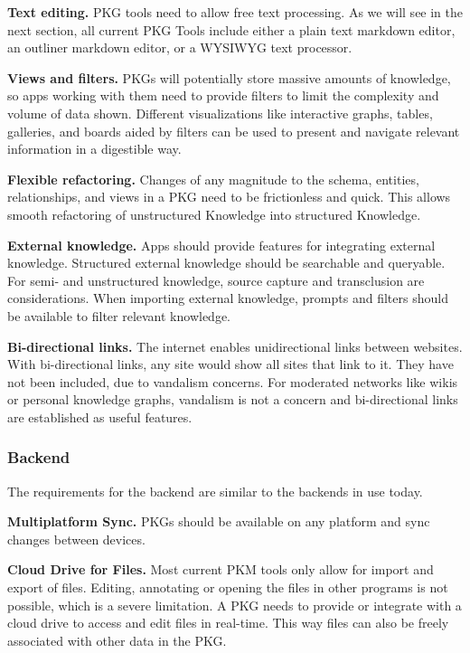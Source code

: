 \textbf{Text editing.} PKG tools need to allow free text processing. As we will see in the next section, all current PKG Tools include either a plain text markdown editor, an outliner markdown editor, or a WYSIWYG text processor.

\textbf{Views and filters.} PKGs will potentially store massive amounts of knowledge, so apps working with them need to provide filters to limit the complexity and volume of data shown. Different visualizations like interactive graphs, tables, galleries, and boards aided by filters can be used to present and navigate relevant information in a digestible way.

\textbf{Flexible refactoring.} Changes of any magnitude to the schema, entities, relationships, and views in a PKG need to be frictionless and quick. This allows smooth refactoring of unstructured Knowledge into structured Knowledge.

\textbf{External knowledge.} Apps should provide features for integrating external knowledge. Structured external knowledge should be searchable and queryable. For semi- and unstructured knowledge, source capture and transclusion are considerations. When importing external knowledge, prompts and filters should be available to filter relevant knowledge.
    
\textbf{Bi-directional links.} The internet enables unidirectional links between websites. With bi-directional links, any site would show all sites that link to it. They have not been included, due to vandalism concerns. For moderated networks like wikis or personal knowledge graphs, vandalism is not a concern and bi-directional links are established as useful features.

\subsubsection*{Backend}
The requirements for the backend are similar to the backends in use today.

\textbf{Multiplatform Sync.} PKGs should be available on any platform and sync changes between devices.

\textbf{Cloud Drive for Files.} Most current PKM tools only allow for import and export of files. Editing, annotating or opening the files in other programs is not possible, which is a severe limitation. A PKG needs to provide or integrate with a cloud drive to access and edit files in real-time. This way files can also be freely associated with other data in the PKG.

